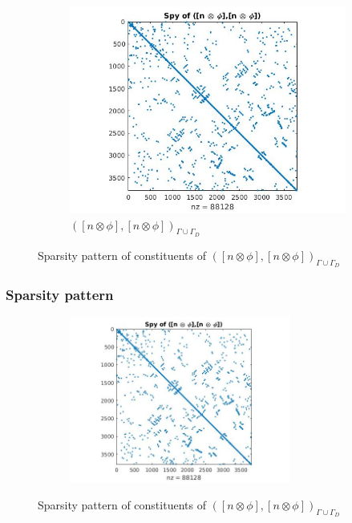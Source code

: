 \documentclass{beamer}
\begin{document}
\begin{frame}
\begin{figure}
\begin{subfigure}{0.35\textwidth}
  \includegraphics[width=\textwidth]{figure2.jpg}
  \caption{$([n \otimes \phi],[n \otimes \phi])_{\Gamma \cup \Gamma_D}$}
  \label{fig:figure2}
\end{subfigure}
\caption{Sparsity pattern of constituents of $([n \otimes \phi],[n \otimes \phi])_{\Gamma \cup \Gamma_D}$}
\label{figure_2_all}
\end{figure}

\end{frame}

\begin{frame}
\frametitle{Sparsity pattern}
\begin{figure}
  \begin{subfigure}{0.8\textwidth}	
\centering
  \includegraphics[width=0.8\textwidth]{figure2.jpg}
  \label{fig:figure2}
\end{subfigure}
\caption{Sparsity pattern of constituents of $([n \otimes \phi],[n \otimes \phi])_{\Gamma \cup \Gamma_D}$}
\label{figure_2_all}
\end{figure}
\end{frame}
\end{document}
